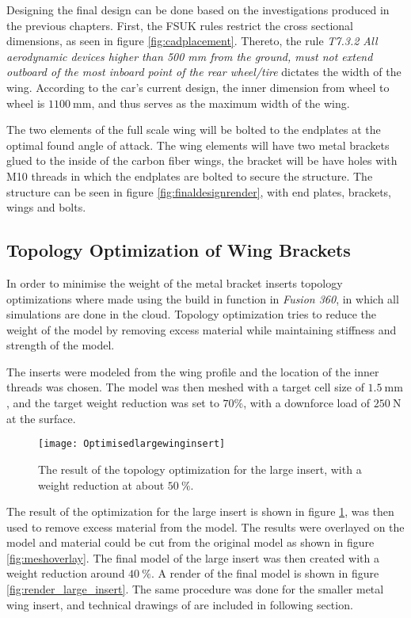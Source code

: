   Designing the final design can be done based on the investigations produced in the previous chapters. First, the FSUK rules restrict the cross sectional dimensions, as seen in figure \ref{fig:cadplacement}. Thereto, the rule \emph{T7.3.2   All aerodynamic devices higher than 500 mm from the ground, must not extend outboard of the most inboard point of the rear wheel/tire} dictates the width of the wing. According to the car's current design, the inner dimension from wheel to wheel is $\SI{1100}{\milli\metre}$, and thus serves as the maximum width of the wing.

  The two elements of the full scale wing will be bolted to the endplates at the optimal found angle of attack. The wing elements will have two metal brackets glued to the inside of the carbon fiber wings, the bracket will be have holes with M10 threads in which the endplates are bolted to secure the structure. The structure can be seen in figure \ref{fig:finaldesignrender}, with end plates, brackets, wings and bolts.

  \subsection{Topology Optimization of Wing Brackets}

  In order to minimise the weight of the metal bracket inserts topology optimizations where made using the build in function in \emph{Fusion 360}, in which all simulations are done in the cloud. Topology optimization tries to reduce the weight of the model by removing excess material while maintaining stiffness and strength of the model.

  The inserts were modeled from the wing profile and the location of the inner threads was chosen. The model was then meshed with a target cell size of $\SI{1.5}{\milli\metre}$, and the target weight reduction was set to $70\%$, with a downforce load of $\SI{250}{\newton}$ at the surface.

  \begin{figure}
    \texttt{[image: Optimisedlargewinginsert]}
    \caption{The result of the topology optimization for the large insert, with a weight reduction at about $\SI{50}{\%}$.}
    \label{fig:topology_large_insert}
  \end{figure}

  The result of the optimization for the large insert is shown in figure \ref{fig:topology_large_insert}, was then used to remove excess material from the model. The results were overlayed on the model and material could be cut from the original model as shown in figure
  \ref{fig:meshoverlay}. The final model of the large insert was then created with a weight reduction around $\SI{40}{\%}$. A render of the final model is shown in
  figure \ref{fig:render_large_insert}. The same procedure was done for the smaller metal wing insert, and technical drawings of are included in following section.

